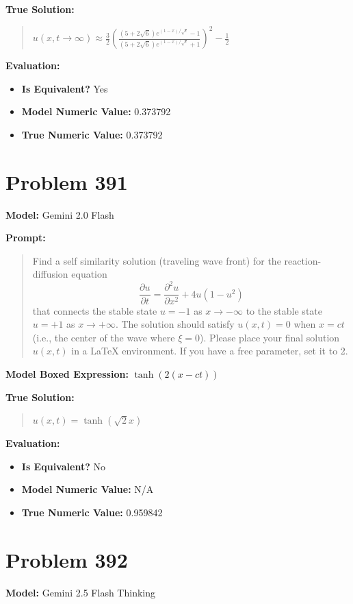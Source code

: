 \documentclass{article}
\begin{document}
{\textbf{True Solution:}
\begin{quote}
$u(x,t \to \infty) \approx \frac{3}{2} \left(\frac{(5+2\sqrt{6}) e^{(1-x)/\sqrt{\epsilon}} - 1}{(5+2\sqrt{6}) e^{(1-x)/\sqrt{\epsilon}} + 1}\right)^2 - \frac{1}{2}$
\end{quote}

\textbf{Evaluation:}
\begin{itemize}
\item \textbf{Is Equivalent?} Yes
\item \textbf{Model Numeric Value:} 0.373792
\item \textbf{True Numeric Value:} 0.373792
\end{itemize}
\vspace{1cm}
\section*{Problem 391}
\textbf{Model:} Gemini 2.0 Flash

\textbf{Prompt:}
\begin{quote}
Find a self similarity solution (traveling wave front) for the reaction-diffusion equation $$ \frac{\partial u}{\partial t} = \frac{\partial^2 u}{\partial x^2} + 4u(1 - u^2) $$ that connects the stable state $u=-1$ as $x \to -\infty$ to the stable state $u=+1$ as $x \to +\infty$. The solution should satisfy $u(x,t) = 0$ when $x=ct$ (i.e., the center of the wave where $\xi=0$). Please place your final solution $u(x,t)$ in a \boxed{} LaTeX environment. If you have a free parameter, set it to 2.
\end{quote}
\textbf{Model Boxed Expression:} $\tanh(2(x-ct))$

\textbf{True Solution:}
\begin{quote}
$u(x,t) = \tanh(\sqrt{2} x)$
\end{quote}

\textbf{Evaluation:}
\begin{itemize}
\item \textbf{Is Equivalent?} No
\item \textbf{Model Numeric Value:} N/A
\item \textbf{True Numeric Value:} 0.959842
\end{itemize}
\vspace{1cm}
\section*{Problem 392}
\textbf{Model:} Gemini 2.5 Flash Thinking

}
\end{document}
